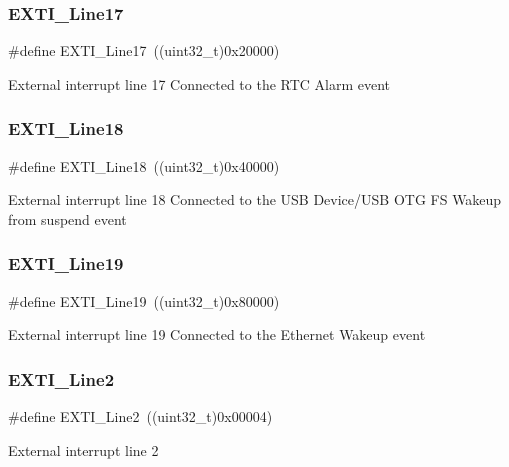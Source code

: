 \subsubsection{\texorpdfstring{EXTI\_Line17}{EXTI\_Line17}}
{\footnotesize\ttfamily \#define E\+X\+T\+I\+\_\+\+Line17~((uint32\+\_\+t)0x20000)}

External interrupt line 17 Connected to the R\+TC Alarm event \mbox{\label{group___e_x_t_i___lines_ga6cdf346a3e7a3c8dbb036aca6741207c}} 
\subsubsection{\texorpdfstring{EXTI\_Line18}{EXTI\_Line18}}
{\footnotesize\ttfamily \#define E\+X\+T\+I\+\_\+\+Line18~((uint32\+\_\+t)0x40000)}

External interrupt line 18 Connected to the U\+SB Device/\+U\+SB O\+TG FS Wakeup from suspend event \mbox{\label{group___e_x_t_i___lines_ga49ac0744621f88d432d85838483ad1de}} 
\subsubsection{\texorpdfstring{EXTI\_Line19}{EXTI\_Line19}}
{\footnotesize\ttfamily \#define E\+X\+T\+I\+\_\+\+Line19~((uint32\+\_\+t)0x80000)}

External interrupt line 19 Connected to the Ethernet Wakeup event \mbox{\label{group___e_x_t_i___lines_gaec4189bb2709c8c15a0339d1b0b9865a}} 
\subsubsection{\texorpdfstring{EXTI\_Line2}{EXTI\_Line2}}
{\footnotesize\ttfamily \#define E\+X\+T\+I\+\_\+\+Line2~((uint32\+\_\+t)0x00004)}

External interrupt line 2 \mbox{\label{group___e_x_t_i___lines_gadea3ef6ab7e8bacc686689de8711b98c}} 
